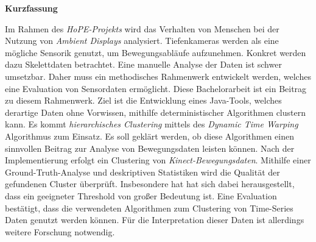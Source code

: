 \vspace*{2cm}

\begin{center}
    \textbf{Kurzfassung}
\end{center}

\vspace*{1cm}

\noindent
Im Rahmen des \emph{HoPE-Projekts} wird das Verhalten von Menschen
bei der Nutzung von \emph{Ambient Displays} analysiert.
Tiefenkameras werden als eine mögliche Sensorik genutzt,
um Bewegungsabläufe aufzunehmen.
Konkret werden dazu Skelettdaten betrachtet.
Eine manuelle Analyse der Daten ist schwer umsetzbar.
Daher muss ein methodisches Rahmenwerk entwickelt werden,
welches eine Evaluation von Sensordaten ermöglicht.
Diese Bachelorarbeit ist ein Beitrag zu diesem Rahmenwerk.
Ziel ist die Entwicklung eines Java-Tools,
welches derartige Daten ohne Vorwissen, mithilfe deterministischer Algorithmen clustern kann.
Es kommt \emph{hierarchisches Clustering}
mittels des \emph{Dynamic Time Warping} Algorithmus zum Einsatz.
Es soll geklärt werden,
ob diese Algorithmen einen sinnvollen Beitrag zur Analyse von Bewegungsdaten leisten können.
Nach der Implementierung erfolgt ein Clustering von \emph{Kinect-Bewegungsdaten}.
Mithilfe einer Ground-Truth-Analyse und deskriptiven Statistiken
wird die Qualität der gefundenen Cluster überprüft.
Insbesondere hat hat sich dabei herausgestellt, dass ein geeigneter Threshold von großer Bedeutung ist.
Eine Evaluation bestätigt, dass die verwendeten Algorithmen zum Clustering
von Time-Series Daten genutzt werden können.
Für die Interpretation dieser Daten ist allerdings weitere Forschung notwendig.